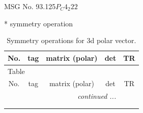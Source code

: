 \documentclass[fleqn,8pt]{jsarticle}
\begin{document}
\setcounter{MaxMatrixCols}{32}

\renewcommand{\tablename}{Table~}
\renewcommand{\figurename}{Figure~}
\begin{center}
\LARGE
MSG No. 93.125\quad$P_{C}4_{2}22$
\end{center}
* symmetry operation
\renewcommand{\arraystretch}{1.3}
\begin{longtable}{ccccc}
\caption{Symmetry operations for 3d polar vector.}
 \\
 \hline \hline
No. & tag & matrix (polar) & det & TR \\ \hline \endfirsthead

\multicolumn{4}{l}{\tablename\ \thetable{}} \\
 \hline \hline
No. & tag & matrix (polar) & det & TR \\ \hline \endhead

 \hline \hline
\multicolumn{4}{r}{\footnotesize\it continued ...} \\ \endfoot

 \hline \hline
\multicolumn{4}{r}{} \\ \endlastfoot


\end{longtable}
\end{document}
